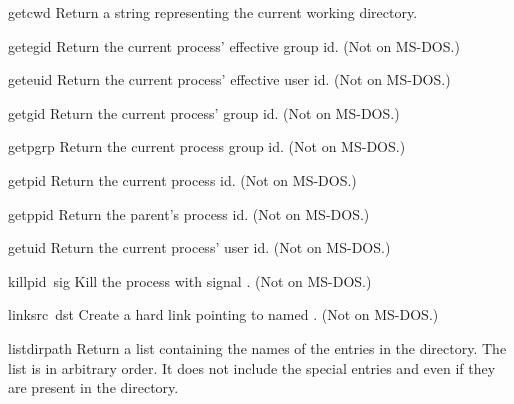 \begin{funcdesc}{getcwd}{}
Return a string representing the current working directory.
\end{funcdesc}

\begin{funcdesc}{getegid}{}
Return the current process' effective group id.
(Not on MS-DOS.)
\end{funcdesc}

\begin{funcdesc}{geteuid}{}
Return the current process' effective user id.
(Not on MS-DOS.)
\end{funcdesc}

\begin{funcdesc}{getgid}{}
Return the current process' group id.
(Not on MS-DOS.)
\end{funcdesc}

\begin{funcdesc}{getpgrp}{}
Return the current process group id.
(Not on MS-DOS.)
\end{funcdesc}

\begin{funcdesc}{getpid}{}
Return the current process id.
(Not on MS-DOS.)
\end{funcdesc}

\begin{funcdesc}{getppid}{}
Return the parent's process id.
(Not on MS-DOS.)
\end{funcdesc}

\begin{funcdesc}{getuid}{}
Return the current process' user id.
(Not on MS-DOS.)
\end{funcdesc}

\begin{funcdesc}{kill}{pid\, sig}
Kill the process  with signal .
(Not on MS-DOS.)
\end{funcdesc}

\begin{funcdesc}{link}{src\, dst}
Create a hard link pointing to  named .
(Not on MS-DOS.)
\end{funcdesc}

\begin{funcdesc}{listdir}{path}
Return a list containing the names of the entries in the directory.
The list is in arbitrary order.  It does not include the special
entries  and  even if they are present in the
directory.
\end{funcdesc}

